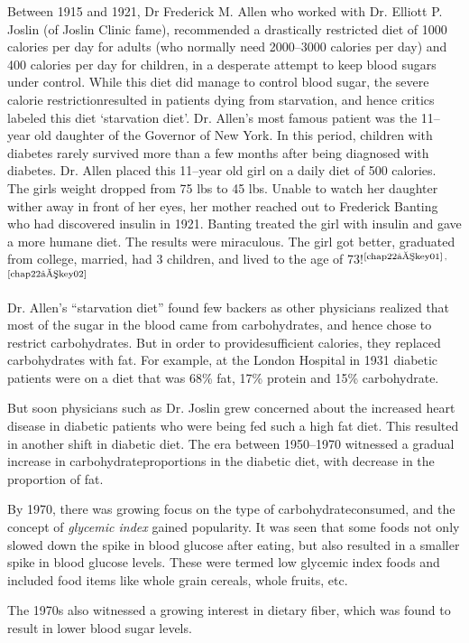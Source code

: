 Between 1915 and 1921, Dr Frederick M. Allen who worked with Dr. Elliott P. Joslin (of Joslin Clinic fame), recommended a drastically restricted diet of 1000 calories per day for adults (who normally need 2000–3000 calories per day) and 400 calories per day for children, in a desperate attempt to keep blood sugars under control. While this diet did manage to control blood sugar, the severe calorie restriction\break resulted in patients dying from starvation, and hence critics labeled this diet ‘starvation diet’. Dr. Allen’s most famous patient was the 11–year old daughter of the Governor of New York. In this period, children with diabetes rarely survived more than a few months after being dia\-gnosed with diabetes. Dr. Allen placed this 11–year old girl on a daily diet of 500 calories. The girls weight dropped from 75 lbs to 45 lbs. Unable to watch her daughter wither away in front of her eyes, her mother reached out to Frederick Banting who had discovered insulin in 1921. Banting treated the girl with insulin and gave a more humane diet. The results were miraculous. The girl got better, graduated from college, married, had 3 children, and lived to the age of 73!$^{\text{\cite{chap22–key01}}}$$^,$$^{\text{\cite{chap22–key02}}}$

Dr. Allen’s “starvation diet” found few backers as other physicians realized that most of the sugar in the blood came from carbohydrates, and hence chose to restrict carbohydrates. But in order to provide\break sufficient calories, they replaced carbohydrates with fat. For example, at the London Hospital in 1931 diabetic patients were on a diet that was 68\% fat, 17\% protein and 15\% carbohydrate.

But soon physicians such as Dr. Joslin grew concerned about the increased heart disease in diabetic patients who were being fed such a high fat diet. This resulted in another shift in diabetic diet. The era between 1950–1970 witnessed a gradual increase in carbohydrate\break proportions in the diabetic diet, with decrease in the proportion of fat.

By 1970, there was growing focus on the type of carbohydrate\break consumed, and the concept of \textit{glycemic index} gained popularity. It was seen that some foods not only slowed down the spike in blood glucose after eating, but also resulted in a smaller spike in blood glucose levels. These were termed low glycemic index foods and included food items like whole grain cereals, whole fruits, etc.

The 1970s also witnessed a growing interest in dietary fiber, which was found to result in lower blood sugar levels.

